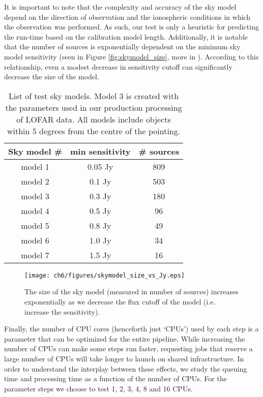 It is important to note that the complexity and accuracy of the sky model depend on the direction of observation and the ionospheric conditions in which the observation was performed. As such, our test is only a heuristic for predicting the run-time based on the calibration model length. Additionally, it is notable that the number of sources is exponentially dependent on the minimum sky model sensitivity (seen in Figure \ref{fig:skymodel_size}, more in \citealt{tgssadr,Wendy_bootes}). According to this relationship, even a modest decrease in sensitivity cutoff can significantly decrease the size of the model.

\begin{table}[!ht]
\centering
\begin{tabular}{||c| c | c||} 
 \hline
 Sky model \# & min sensitivity & \# sources  \\ [0.5ex] 
 \hline
 model 1 & 0.05 Jy & 809    \\ 
 model 2 & 0.1 Jy & 503   \\
 \rowcolor{Gray}
  \hline
 model 3 & 0.3 Jy & 180   \\
  \hline
 model 4 & 0.5 Jy & 96  \\
 model 5 & 0.8 Jy & 49   \\ 
 model 6 & 1.0 Jy & 34   \\
 model 7 & 1.5 Jy & 16   \\[1ex] 
 \hline
\end{tabular}
\caption{List of test sky models. Model 3 is created with the parameters used in our production processing of LOFAR data. All models include objects within 5 degrees from the centre of the pointing.  }
\label{table:skymodels}
\end{table}


\begin{figure}
    \texttt{[image: ch6/figures/skymodel\_size\_vs\_Jy.eps]}
      \caption{The size of the sky model (measured in number of sources) increases exponentially as we decrease the flux cutoff of the model (i.e. increase the sensitivity).}
	\label{fig:ch6_skymodel_size}
\end{figure}


Finally, the number of CPU cores (henceforth just `CPUs') used by each step is a parameter that can be optimized for the entire pipeline. While increasing the number of CPUs can make some steps run faster, requesting jobs that reserve a large number of CPUs will take longer to launch on shared infrastructure. In order to understand the interplay between these effects, we study the queuing time and processing time as a function of the number of CPUs. For the parameter steps we choose to test 1, 2, 3, 4, 8 and 16 CPUs. 

